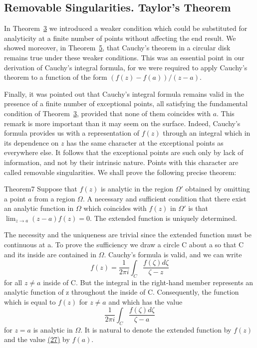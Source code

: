 \setcounter{section}{3}\setcounter{subsection}{0}\subsection{Removable Singularities. Taylor's Theorem}\label{sec:4.3.1}
In Theorem~\hyperref[thm:4.3]{3} we introduced a weaker condition which could be substituted for analyticity at a finite number of points without affecting the end result. We showed moreover, in Theorem~\hyperref[thm:4.5]{5}, that Cauchy's theorem in a circular disk remains true under these weaker conditions. This was an essential point in our derivation of Cauchy's integral formula, for we were required to apply Cauchy's theorem to a function of the form $(f(z) - f(a))/(z - a)$.

Finally, it was pointed out that Cauchy's integral formula remains valid in the presence of a finite number of exceptional points, all satisfying the fundamental condition of Theorem~\hyperref[thm:4.3]{3}, provided that none of them coincides with $a$. This remark is more important than it may seem on the surface. Indeed, Cauchy's formula provides us with a representation of $f(z)$ through an integral which in its dependence on $z$ has the same character at the exceptional points as everywhere else. It follows that the exceptional points are such only by lack of information, and not by their intrinsic nature. Points with this character are called removable singularities. We shall prove the following precise theorem:

\begin{originalstatement}{Theorem}{7}\label{thm:4.7}
Suppose that $f(z)$ is analytic in the region $\Omega'$ obtained by omitting a point $a$ from a region $\Omega$. A necessary and sufficient condition that there exist an analytic function in $\Omega$ which coincides with $f(z)$ in $\Omega'$ is that $\lim_{z \to a} (z - a)f(z) = 0$. The extended function is uniquely determined.
\end{originalstatement}
The necessity and the uniqueness are trivial since the extended function must be continuous at a. To prove the sufficiency we draw a circle C about a so that C and its inside are contained in $\Omega$. Cauchy's formula is valid, and we can write
\begin{equation*}
f (z) = \frac {1}{2 \pi i} \int_ {C} \frac {f (\zeta) d \zeta}{\zeta - z}
\end{equation*}
for all $z \neq a$ inside of C. But the integral in the right-hand member represents an analytic function of z throughout the inside of C. Consequently, the function which is equal to $f(z)$ for $z \neq a$ and which has the value
\begin{equation*}
\frac {1}{2 \pi i} \int_ {C} \frac {f (\zeta) d \zeta}{\zeta - a}\tag{27}\label{eq:4.27}
\end{equation*}
for $z = a$ is analytic in $\Omega$. It is natural to denote the extended function by $f(z)$ and the value \hyperref[eq:4.27]{(27)} by $f(a)$.

